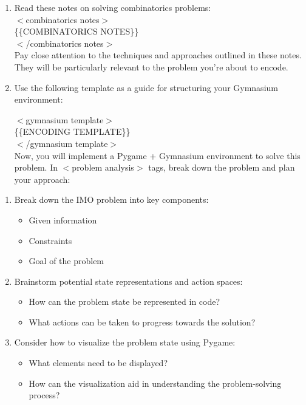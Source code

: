 {\begin{tcolorbox}
\begin{enumerate}
\item Read these notes on solving combinatorics problems: \\
$<$combinatorics notes$>$ \\
\{\{COMBINATORICS NOTES\}\} \\
$<$/combinatorics notes$>$ \\
Pay close attention to the techniques and approaches outlined in these notes. They will be particularly relevant to the problem you're about to encode.\\

\item Use the following template as a guide for structuring your Gymnasium environment:

$<$gymnasium template$>$ \\
\{\{ENCODING TEMPLATE\}\} \\
$<$/gymnasium template$>$ \\

Now, you will implement a Pygame + Gymnasium environment to solve this problem. In $<$problem analysis$>$ tags, break down the problem and plan your approach:
\end{enumerate}

\begin{enumerate}
\item Break down the IMO problem into key components:
\begin{itemize}
\item Given information
\item Constraints
\item Goal of the problem
\end{itemize}

\item Brainstorm potential state representations and action spaces:
\begin{itemize}
\item How can the problem state be represented in code?
\item What actions can be taken to progress towards the solution?
\end{itemize}

\item Consider how to visualize the problem state using Pygame:
\begin{itemize}
\item What elements need to be displayed?
\item How can the visualization aid in understanding the problem-solving process?
\end{itemize}
\end{enumerate}


\end{tcolorbox}}
